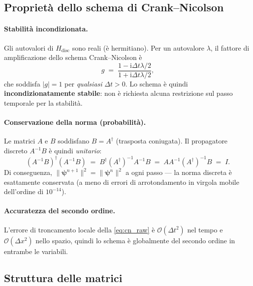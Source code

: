 \documentclass[12pt, a4paper]{article}
\newcommand{\dt}{\Delta t}
\newcommand{\dx}{\Delta x}
\newcommand{\ii}{\mathrm{i}}          %
\newcommand{\CN}{Crank--Nicolson}
\begin{document}
\subsection{Proprietà dello schema di Crank--Nicolson}
\label{sec:cn_properties}

\paragraph{Stabilità incondizionata.}
Gli autovalori di $H_\text{disc}$ sono reali (è hermitiano).  Per un
autovalore $\lambda$, il fattore di amplificazione dello schema \CN{}
è
\begin{equation}
  g \;=\; \frac{1 - \ii\dt\lambda/2}{1 + \ii\dt\lambda/2},
\end{equation}
che soddisfa $|g| = 1$ per \emph{qualsiasi} $\dt > 0$.  Lo schema è
quindi \textbf{incondizionatamente stabile}: non è richiesta alcuna
restrizione sul passo temporale per la stabilità.

\paragraph{Conservazione della norma (probabilità).}
Le matrici $A$ e $B$ soddisfano $B = A^\dagger$ (trasposta
coniugata).  Il propagatore discreto $A^{-1}B$ è quindi
\emph{unitario}:
\begin{equation}
  (A^{-1}B)^\dagger (A^{-1}B)
  \;=\; B^\dagger (A^\dagger)^{-1} A^{-1} B
  \;=\; A A^{-1} (A^\dagger)^{-1} B
  \;=\; I.
\end{equation}
Di conseguenza, $\|\boldsymbol{\psi}^{n+1}\|^2 =
\|\boldsymbol{\psi}^n\|^2$ a ogni passo --- la norma discreta è
esattamente conservata (a meno di errori di arrotondamento in virgola
mobile dell'ordine di $10^{-14}$).

\paragraph{Accuratezza del secondo ordine.}
L'errore di troncamento locale della \eqref{eq:cn_raw} è
$\mathcal{O}(\dt^2)$ nel tempo e $\mathcal{O}(\dx^2)$ nello spazio,
quindi lo schema è globalmente del secondo ordine in entrambe le
variabili.

\subsection{Struttura delle matrici}
\end{document}
